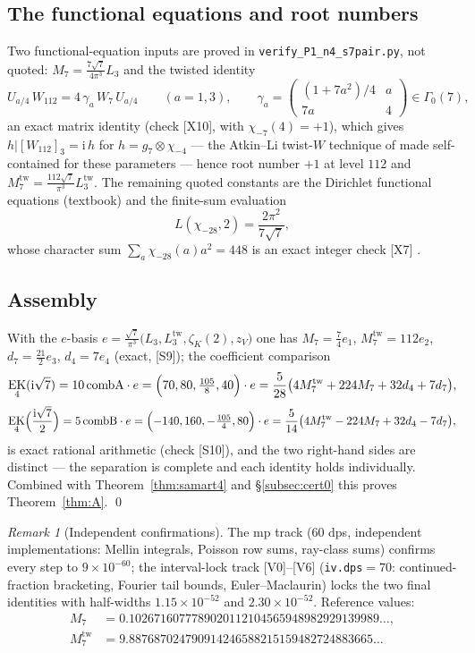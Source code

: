 \documentclass[11pt]{article}
\newcommand{\ii}{\mathrm{i}}
\DeclareMathOperator{\EK}{EK}
\theoremstyle{definition}
\theoremstyle{remark}
\newtheorem{remark}[theorem]{Remark}
\begin{document}
\subsection{The functional equations and root numbers}\label{subsec:app1FE}

Two functional-equation inputs are proved in
\texttt{verify\_P1\_n4\_s7pair.py}, not quoted:
$M_7=\frac{7\sqrt7}{4\pi^3}L_3$ \cite[Lemma~2.8]{Zf} and the twisted
identity
\begin{equation}\label{eq:twistfricke}
  U_{a/4}\,W_{112}=4\,\gamma_a\,W_7\,U_{a/4}\qquad(a=1,3),
  \qquad
  \gamma_a=\begin{pmatrix}(1+7a^2)/4 & a\\ 7a & 4\end{pmatrix}
  \in\Gamma_0(7),
\end{equation}
an exact matrix identity (check [X10], with $\chi_{-7}(4)=+1$), which
gives $h|[W_{112}]_3=\ii\,h$ for $h=g_7\otimes\chi_{-4}$ --- the
Atkin--Li twist-$W$ technique of \cite{AL} made self-contained for
these parameters --- hence root number $+1$ at level $112$ and
$M_7^{\mathrm{tw}}=\frac{112\sqrt7}{\pi^3}L_3^{\mathrm{tw}}$. The
remaining quoted constants are the Dirichlet functional equations
(textbook) and the finite-sum evaluation
\[
  L(\chi_{-28},2)=\frac{2\pi^2}{7\sqrt7},
\]
whose character sum $\sum_a\chi_{-28}(a)a^2=448$ is an exact integer
check [X7] \cite{Wa}.

\subsection{Assembly}

With the $e$-basis
$e=\frac{\sqrt7}{\pi^3}\bigl(L_3,L_3^{\mathrm{tw}},\zeta_K(2),z_V\bigr)$
one has $M_7=\frac74e_1$, $M_7^{\mathrm{tw}}=112e_2$,
$d_7=\frac{21}{2}e_3$, $d_4=7e_4$ (exact, [S9]); the coefficient
comparison
\[
  \EK_4(\ii\sqrt7)=10\,\mathrm{combA}\cdot e
  =\Bigl(70,80,\tfrac{105}{8},40\Bigr)\cdot e
  =\frac{5}{28}\bigl(4M_7^{\mathrm{tw}}+224M_7+32d_4+7d_7\bigr),
\]
\[
  \EK_4\Bigl(\frac{\ii\sqrt7}2\Bigr)=5\,\mathrm{combB}\cdot e
  =\Bigl(-140,160,-\tfrac{105}{4},80\Bigr)\cdot e
  =\frac{5}{14}\bigl(4M_7^{\mathrm{tw}}-224M_7+32d_4-7d_7\bigr),
\]
is exact rational arithmetic (check [S10]), and the two right-hand
sides are distinct --- the separation is complete and each identity
holds individually. Combined with Theorem~\ref{thm:samart4} and
\S\ref{subsec:cert0} this proves Theorem~\ref{thm:A}. \qed

\begin{remark}[Independent confirmations]
The mp track (60 dps, independent implementations: Mellin
integrals, Poisson row sums, ray-class sums) confirms every step to
$9\times10^{-60}$; the interval-lock track [V0]--[V6]
(\texttt{iv.dps}$=70$: continued-fraction bracketing, Fourier tail
bounds, Euler--Maclaurin) locks the two final identities with
half-widths $1.15\times10^{-52}$ and $2.30\times10^{-52}$.
Reference values:
\begin{align*}
  M_7&=0.1026716077789020112104565948982929139989\ldots,\\
  M_7^{\mathrm{tw}}&=9.887687024790914246588215159482724883665\ldots
\end{align*}
\end{remark}
\end{document}
